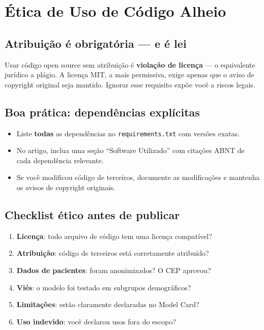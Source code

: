
\section{Ética de Uso de Código Alheio}

\subsection{Atribuição é obrigatória — e é lei}

Usar código open source sem atribuição é \textbf{violação de licença}
— o equivalente jurídico a plágio. A licença MIT, a mais permissiva,
exige apenas que o aviso de copyright original seja mantido. Ignorar
esse requisito expõe você a riscos legais.

\subsection{Boa prática: dependências explícitas}

\begin{itemize}
  \item Liste \textbf{todas} as dependências no \texttt{requirements.txt}
    com versões exatas.
  \item No artigo, inclua uma seção ``Software Utilizado'' com citações
    ABNT de cada dependência relevante.
  \item Se você modificou código de terceiros, documente as modificações
    e mantenha os avisos de copyright originais.
\end{itemize}

\subsection{Checklist ético antes de publicar}

\begin{enumerate}
  \item \textbf{Licença}: todo arquivo de código tem uma licença compatível?
  \item \textbf{Atribuição}: código de terceiros está corretamente atribuído?
  \item \textbf{Dados de pacientes}: foram anonimizados? O CEP aprovou?
  \item \textbf{Viés}: o modelo foi testado em subgrupos demográficos?
  \item \textbf{Limitações}: estão claramente declaradas no Model Card?
  \item \textbf{Uso indevido}: você declarou usos fora do escopo?
\end{enumerate}

